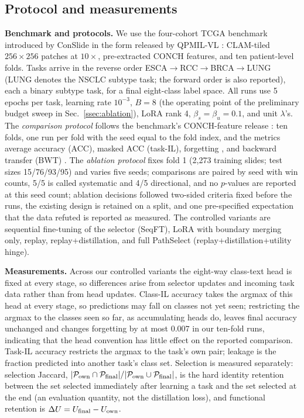 \documentclass{article}
\newcommand{\Psel}{\mathcal{P}}
\begin{document}
\subsection{Protocol and measurements}

\textbf{Benchmark and protocols.}
We use the four-cohort TCGA benchmark introduced by ConSlide \cite{huang2023conslide} in the form released by QPMIL-VL \cite{gou2025qpmil}: CLAM-tiled $256\times256$ patches at $10\times$, pre-extracted CONCH features, and ten patient-level folds. Tasks arrive in the reverse order ESCA$\rightarrow$RCC$\rightarrow$BRCA$\rightarrow$LUNG (LUNG denotes the NSCLC subtype task; the forward order is also reported), each a binary subtype task, for a final eight-class label space. All runs use 5 epochs per task, learning rate $10^{-3}$, $B=8$ (the operating point of the preliminary budget sweep in Sec.~\ref{ssec:ablation}), LoRA rank 4, $\beta_s{=}\beta_u{=}0.1$, and unit $\lambda$'s. The \emph{comparison protocol} follows the benchmark's CONCH-feature release \cite{gou2025qpmil}: ten folds, one run per fold with the seed equal to the fold index, and the metrics average accuracy (ACC), masked ACC (task-IL), forgetting \cite{chaudhry2018rwalk}, and backward transfer (BWT) \cite{lopezpaz2017gem}. The \emph{ablation protocol} fixes fold 1 (2,273 training slides; test sizes 15/76/93/95) and varies five seeds; comparisons are paired by seed with win counts, 5/5 is called systematic and 4/5 directional, and no $p$-values are reported at this seed count; ablation decisions followed two-sided criteria fixed before the runs, the existing design is retained on a split, and one pre-specified expectation that the data refuted is reported as measured. The controlled variants are sequential fine-tuning of the selector (SeqFT), LoRA with boundary merging only, replay, replay+distillation, and full PathSelect (replay+distillation+utility hinge).

\textbf{Measurements.}
Across our controlled variants the eight-way class-text head is fixed at every stage, so differences arise from selector updates and incoming task data rather than from head updates. Class-IL accuracy takes the argmax of this head at every stage, so predictions may fall on classes not yet seen; restricting the argmax to the classes seen so far, as accumulating heads do, leaves final accuracy unchanged and changes forgetting by at most $0.007$ in our ten-fold runs, indicating that the head convention has little effect on the reported comparison. Task-IL accuracy restricts the argmax to the task's own pair; leakage is the fraction predicted into another task's class set. Selection is measured separately: selection Jaccard, $|\Psel_{\rm own}\cap\Psel_{\rm final}|/|\Psel_{\rm own}\cup\Psel_{\rm final}|$, is the hard identity retention between the set selected immediately after learning a task and the set selected at the end (an evaluation quantity, not the distillation loss), and functional retention is $\Delta U=U_{\rm final}-U_{\rm own}$.
\end{document}
